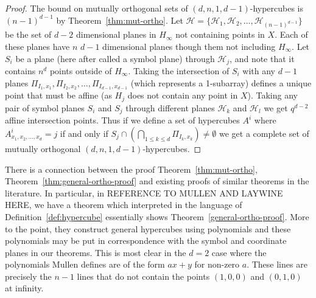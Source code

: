 \documentclass{article}
\begin{document}
\begin{proof}
 The bound on mutually orthogonal sets of \((d, n, 1, d - 1)\)-hypercubes is \((n - 1)^{d - 1}\) by Theorem~\ref{thm:mut-ortho}. Let \(\mathcal{H} = \{\mathcal{H}_{1}, \mathcal{H}_{2}, \ldots, \mathcal{H}_{(n - 1)^{d - 1}}\}\) be the set of \(d - 2\) dimensional planes in \(H_{\infty}\) not containing points in \(X\). Each of these planes have \(n\) \(d - 1\) dimensional planes though them not including \(H_{\infty}\). Let \(S_{i}\) be a plane (here after called a symbol plane) through \(\mathcal{H}_{j}\), and note that it contains \(n^{d}\) points outside of \(H_{\infty}\). Taking the intersection of \(S_{i}\) with any \(d - 1\) planes \(\Pi_{I_{1}, x_{1}}, \Pi_{I_{2}, x_{2}}, \ldots, \Pi_{I_{d - 1}, x_{d - 1}}\) (which represents a 1-subarray) defines a unique point that must be affine (as \(H_{j}\) does not contain any point in \(X\)). Taking any pair of symbol planes \(S_{i}\) and \(S_{j}\) through different planes \(\mathcal{H}_{k}\) and \(\mathcal{H}_{l}\) we get \(q^{d - 2}\) affine intersection points. Thus if we define a set of hypercubes \(A^{i}\) where \(A^{i}_{x_{1}, x_{2}, \ldots, x_{d}} = j\) if and only if \(S_{j} \cap (\bigcap_{1 \le k \le d}\Pi_{I_{k}, x_{k}}) \ne \emptyset\) we get a complete set of mutually orthogonal \((d, n, 1, d - 1)\)-hypercubes.


\end{proof}

There is a connection between the proof Theorem~\ref{thm:mut-ortho}, Theorem~\ref{thm:general-ortho-proof} and existing proofs of similar theorems in the literature. In particular, in REFERENCE TO MULLEN AND LAYWINE HERE, we have a theorem which interpreted in the language of Definition~\ref{def:hypercube} essentially shows Theorem~\ref{general-ortho-proof}. More to the point, they construct general hypercubes using polynomials and these polynomials may be put in correspondence with the symbol and coordinate planes in our theorems. This is most clear in the \(d = 2\) case where the polynomials Mullen defines are of the form \(ax + y\) for non-zero \(a\). These lines are precisely the \(n - 1\) lines that do not contain the points \((1, 0, 0)\) and \((0, 1, 0)\) at infinity.
\end{document}

